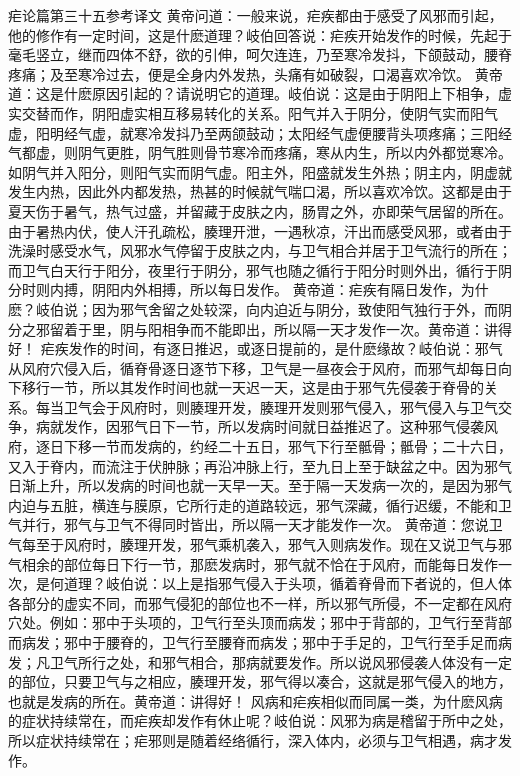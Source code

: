 \documentclass[a4paper,12pt,UTF8,twoside]{ctexbook}
\begin{document}
疟论篇第三十五参考译文
黄帝问道：一般来说，疟疾都由于感受了风邪而引起，他的修作有一定时间，这是什麽道理？岐伯回答说：疟疾开始发作的时候，先起于毫毛竖立，继而四体不舒，欲的引伸，呵欠连连，乃至寒冷发抖，下颌鼓动，腰脊疼痛；及至寒冷过去，便是全身内外发热，头痛有如破裂，口渴喜欢冷饮。
黄帝道：这是什麽原因引起的？请说明它的道理。岐伯说：这是由于阴阳上下相争，虚实交替而作，阴阳虚实相互移易转化的关系。阳气并入于阴分，使阴气实而阳气虚，阳明经气虚，就寒冷发抖乃至两颌鼓动；太阳经气虚便腰背头项疼痛；三阳经气都虚，则阴气更胜，阴气胜则骨节寒冷而疼痛，寒从内生，所以内外都觉寒冷。如阴气并入阳分，则阳气实而阴气虚。阳主外，阳盛就发生外热；阴主内，阴虚就发生内热，因此外内都发热，热甚的时候就气喘口渴，所以喜欢冷饮。这都是由于夏天伤于暑气，热气过盛，并留藏于皮肤之内，肠胃之外，亦即荣气居留的所在。由于暑热内伏，使人汗孔疏松，腠理开泄，一遇秋凉，汗出而感受风邪，或者由于洗澡时感受水气，风邪水气停留于皮肤之内，与卫气相合并居于卫气流行的所在；而卫气白天行于阳分，夜里行于阴分，邪气也随之循行于阳分时则外出，循行于阴分时则内搏，阴阳内外相搏，所以每日发作。
黄帝道：疟疾有隔日发作，为什麽？岐伯说；因为邪气舍留之处较深，向内迫近与阴分，致使阳气独行于外，而阴分之邪留着于里，阴与阳相争而不能即出，所以隔一天才发作一次。黄帝道：讲得好！
疟疾发作的时间，有逐日推迟，或逐日提前的，是什麽缘故？岐伯说：邪气从风府穴侵入后，循脊骨逐日逐节下移，卫气是一昼夜会于风府，而邪气却每日向下移行一节，所以其发作时间也就一天迟一天，这是由于邪气先侵袭于脊骨的关系。每当卫气会于风府时，则腠理开发，腠理开发则邪气侵入，邪气侵入与卫气交争，病就发作，因邪气日下一节，所以发病时间就日益推迟了。这种邪气侵袭风府，逐日下移一节而发病的，约经二十五日，邪气下行至骶骨；骶骨；二十六日，又入于脊内，而流注于伏肿脉；再沿冲脉上行，至九日上至于缺盆之中。因为邪气日渐上升，所以发病的时间也就一天早一天。至于隔一天发病一次的，是因为邪气内迫与五脏，横连与膜原，它所行走的道路较远，邪气深藏，循行迟缓，不能和卫气并行，邪气与卫气不得同时皆出，所以隔一天才能发作一次。
黄帝道：您说卫气每至于风府时，腠理开发，邪气乘机袭入，邪气入则病发作。现在又说卫气与邪气相余的部位每日下行一节，那麽发病时，邪气就不恰在于风府，而能每日发作一次，是何道理？岐伯说：以上是指邪气侵入于头项，循着脊骨而下者说的，但人体各部分的虚实不同，而邪气侵犯的部位也不一样，所以邪气所侵，不一定都在风府穴处。例如：邪中于头项的，卫气行至头顶而病发；邪中于背部的，卫气行至背部而病发；邪中于腰脊的，卫气行至腰脊而病发；邪中于手足的，卫气行至手足而病发；凡卫气所行之处，和邪气相合，那病就要发作。所以说风邪侵袭人体没有一定的部位，只要卫气与之相应，腠理开发，邪气得以凑合，这就是邪气侵入的地方，也就是发病的所在。黄帝道：讲得好！
风病和疟疾相似而同属一类，为什麽风病的症状持续常在，而疟疾却发作有休止呢？岐伯说：风邪为病是稽留于所中之处，所以症状持续常在；疟邪则是随着经络循行，深入体内，必须与卫气相遇，病才发作。
\end{document}
